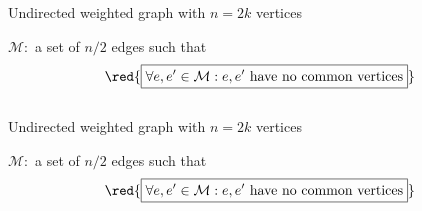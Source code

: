 
\begin{frame}{}
  \begin{definition}
    \begin{center}
      Undirected weighted graph with $n = 2k$ vertices \\[15pt] \pause

      $\mathcal{M}:$ a set of $n/2$ edges such that
      \[
	\red{\boxed{\forall e, e' \in \mathcal{M}: e, e' \text{ have no common vertices}}}
      \]
    \end{center}

  \end{definition}
\end{frame}

\begin{frame}{}
  \begin{columns}
      \pause
      {\centerline{}}
      \pause
      {\centerline{}}
  \end{columns}
\end{frame}
\begin{frame}{}
  \begin{definition}
    \begin{center}
      Undirected weighted graph with $n = 2k$ vertices \\[15pt] \pause

      $\mathcal{M}:$ a set of $n/2$ edges such that
      \[
	\red{\boxed{\forall e, e' \in \mathcal{M}: e, e' \text{ have no common vertices}}}
      \]
    \end{center}

  \end{definition}
\end{frame}

